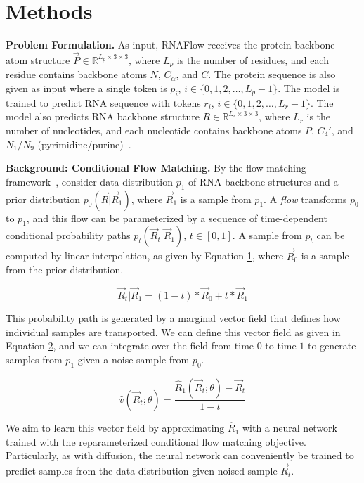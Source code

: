\section{Methods}

\textbf{Problem Formulation.} As input, RNAFlow receives the protein backbone atom structure $\vec P \in \mathbb{R}^{L_p\times3\times3}$, where $L_p$ is the number of residues, and each residue contains backbone atoms $N$, $C_\alpha$, and $C$. The protein sequence is also given as input where a single token is $p_i$, $i \in \{0, 1, 2, \ldots, L_p - 1\}$. The model is trained to predict RNA sequence with tokens $r_i$, $i \in \{0, 1, 2, \ldots, L_r - 1\}$. The model also predicts RNA backbone structure $R \in \mathbb{R}^{L_r\times3\times3}$, where $L_r$ is the number of nucleotides, and each nucleotide contains backbone atoms $P$, $C_{4}'$, and $N_{1}/N_{9}$ (pyrimidine/purine)~\citep{wadley2007evaluating}.

\textbf{Background: Conditional Flow Matching.} By the flow matching framework~\cite{lipman2022flow}, consider data distribution $p_1$ of RNA backbone structures and a prior distribution $p_0(\vec R | \vec R_1)$, where $\vec R_1$ is a sample from $p_1$. A \textit{flow} transforms $p_0$ to $p_1$, and this flow can be parameterized by a sequence of time-dependent conditional probability paths $p_t(\vec R_t | \vec R_1)$, $t \in [0,1]$. A sample from $p_t$ can be computed by linear interpolation, as given by Equation \hyperref[interpolation]{1}, where $\vec R_0$ is a sample from the prior distribution.

\begin{equation}\label{interpolation}
\vec R_t | \vec R_1 = (1 - t) * \vec R_0 + t * \vec R_1
\end{equation}

This probability path is generated by a marginal vector field that defines how individual samples are transported. We can define this vector field as given in Equation \hyperref[vecfield]{2}, and we can integrate over the field from time $0$ to time $1$ to generate samples from $p_1$ given a noise sample from $p_0$.

\begin{equation}\label{vecfield}
\hat v (\vec R_t; \theta) = \frac{\hat R_1(\vec R_t; \theta) - \vec R_t}{1 - t}
\end{equation}

We aim to learn this vector field by approximating $\hat R_1$ with a neural network trained with the reparameterized conditional flow matching objective. Particularly, as with diffusion, the neural network can conveniently be trained to predict samples from the data distribution given noised sample $\vec R_t$.

